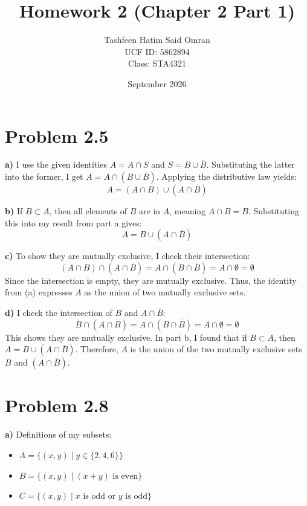 \documentclass[11pt, letterpaper]{article}
\title{\textbf{Homework 2 (Chapter 2 Part 1)}}
\author{
    Tashfeen Hatim Said Omran \\ 
    UCF ID: 5862894 \\ 
    Class: STA4321
}
\date{September 2026}
\newcommand{\comp}[1]{\overline{#1}}
\begin{document}
\maketitle

\section*{Problem 2.5}
\textbf{a)} I use the given identities $A = A \cap S$ and $S = B \cup \comp{B}$. Substituting the latter into the former, I get $A = A \cap (B \cup \comp{B})$. Applying the distributive law yields:
\[ A = (A \cap B) \cup (A \cap \comp{B}) \]

\textbf{b)} If $B \subset A$, then all elements of $B$ are in $A$, meaning $A \cap B = B$. Substituting this into my result from part a gives:
\[ A = B \cup (A \cap \comp{B}) \]

\textbf{c)} To show they are mutually exclusive, I check their intersection:
\[ (A \cap B) \cap (A \cap \comp{B}) = A \cap (B \cap \comp{B}) = A \cap \emptyset = \emptyset \]
Since the intersection is empty, they are mutually exclusive. Thus, the identity from (a) expresses $A$ as the union of two mutually exclusive sets.

\textbf{d)} I check the intersection of $B$ and $A \cap \comp{B}$:
\[ B \cap (A \cap \comp{B}) = A \cap (B \cap \comp{B}) = A \cap \emptyset = \emptyset \]
This shows they are mutually exclusive. In part b, I found that if $B \subset A$, then $A = B \cup (A \cap \comp{B})$. Therefore, $A$ is the union of the two mutually exclusive sets $B$ and $(A \cap \comp{B})$.

\section*{Problem 2.8}
\textbf{a)} Definitions of my subsets:
\begin{itemize}
    \item $A = \{(x,y) \mid y \in \{2,4,6\}\}$
    \item $B = \{(x,y) \mid (x+y) \text{ is even}\}$
    \item $C = \{(x,y) \mid x \text{ is odd or } y \text{ is odd}\}$
\end{itemize}
\end{document}
